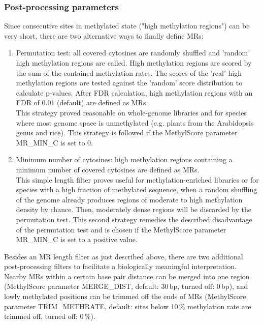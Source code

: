 \documentclass{article}
\begin{document}
\subsubsection*{Post-processing parameters}
\label{permutation_test}
Since consecutive sites in methylated state ("high methylation regions") can be very short, there are two alternative ways to finally define MRs:
\begin{enumerate}
	\item Permutation test: all covered cytosines are randomly shuffled and 'random' high methylation regions are called. High methylation regions are scored by the sum of the contained methylation rates. The scores of the 'real' high methylation regions are tested against the 'random' score distribution to calculate p-values. After FDR calculation, high methylation regions with an FDR of 0.01 (default) are defined as MRs.\\
	This strategy proved reasonable on whole-genome libraries and for species where most genome space is unmethylated (e.g. plants from the Arabidopsis genus and rice). %
	This strategy is followed if the MethylScore parameter MR\_MIN\_C is set to 0.
	\item Minimum number of cytosines: high methylation regions containing a minimum number of covered cytosines are defined as MRs.\\
	This simple length filter proves useful for methylation-enriched libraries or for species with a high fraction of methylated sequence, when a random shuffling of the genome already produces regions of moderate to high methylation density by chance. Then, moderately dense regions will be discarded by the permutation test. This second strategy remedies the described disadvantage of the permutation test and is chosen if the MethylScore parameter MR\_MIN\_C is set to a positive value.
\end{enumerate}

Besides an MR length filter as just described above, there are two additional post-processing filters to facilitate a biologically meaningful interpretation. Nearby MRs within a certain base pair distance can be merged into one region (MethylScore parameter MERGE\_DIST, default: 30\,bp, turned off: 0\,bp), and lowly methylated positions can be trimmed off the ends of MRs (MethylScore parameter TRIM\_METHRATE, default: sites below 10\,\% methylation rate are trimmed off, turned off: 0\,\%).
\end{document}
